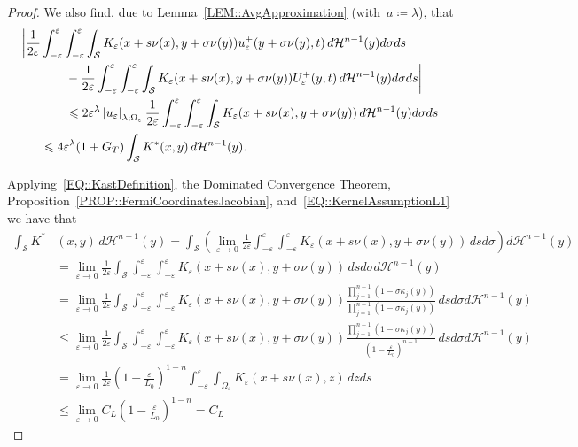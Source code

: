 \documentclass[12pt,a4paper]{amsart}
\makeatletter
\numberwithin{equation}{section}
\theoremstyle{definition}
\theoremstyle{remark}
\newcommand{\eps}{\varepsilon}
\newcommand{\abs}[1]{\left\lvert#1\right\rvert}
\renewcommand{\leq}{\leqslant}
\newcommand{\const}[1]{%
  \csname const@#1\endcsname%
}
\newcommand{\constapp}[1]{%
  \csname constapp@#1\endcsname%
}
\makeatother
\begin{document}
\begin{proof}
    We also find, due to Lemma~\ref{LEM::AvgApproximation} (with~$a\coloneq\lambda$), that
    \begin{equation}\label{EQ::KepsEstimateUu}
        \begin{split}
            \bigg|\frac{1}{2\eps}&\int_{-\eps}^\eps \int_{-\eps}^\eps\int_{\mathcal{S}} K_\eps(x+s\nu(x),y+\sigma\nu(y))u_\eps^+(y+\sigma\nu(y),t)\,d\mathcal{H}^{n-1}(y)d\sigma ds\\
                &\qquad - \frac{1}{2\eps}\int_{-\eps}^\eps \int_{-\eps}^\eps\int_{\mathcal{S}} K_\eps(x+s\nu(x),y+\sigma\nu(y))U_\eps^+(y,t)\,d\mathcal{H}^{n-1}(y)d\sigma ds\bigg|\\
                &\qquad \leq 2\eps^{\lambda}\abs{u_\eps}_{\lambda;\Omega_\eps}\frac{1}{2\eps}\int_{-\eps}^\eps \int_{-\eps}^\eps\int_{\mathcal{S}} K_\eps(x+s\nu(x),y+\sigma\nu(y))\,d\mathcal{H}^{n-1}(y)d\sigma ds\\
                &\leq 4\eps^\lambda \constapp{CONST::HolderEmbeddingA}\const{CONST::UniformRegularity}(1+G_T)\int_{\mathcal{S}}K^\ast(x,y)\,d\mathcal{H}^{n-1}(y).
        \end{split}
    \end{equation}

    Applying~\eqref{EQ::KastDefinition}, the Dominated Convergence Theorem, Proposition~\ref{PROP::FermiCoordinatesJacobian}, and~\eqref{EQ::KernelAssumptionL1} we have that
    \begin{equation}\label{EQ::KastIsL1}
        \begin{split}
            \int_{\mathcal{S}}K^\ast&(x,y)\,d\mathcal{H}^{n-1}(y) = \int_{\mathcal{S}}\left(\lim_{\eps \to 0}\frac{1}{2\eps}\int_{-\eps}^\eps \int_{-\eps}^\eps K_\eps(x+s\nu(x),y+\sigma\nu(y))\,dsd\sigma\right) d\mathcal{H}^{n-1}(y)\\
                & = \lim_{\eps \to 0} \frac{1}{2\eps} \int_{\mathcal{S}}\int_{-\eps}^\eps \int_{-\eps}^\eps K_\eps(x+s\nu(x),y+\sigma\nu(y))\,dsd\sigma d\mathcal{H}^{n-1}(y)\\
                & = \lim_{\eps \to 0} \frac{1}{2\eps} \int_{\mathcal{S}}\int_{-\eps}^\eps \int_{-\eps}^\eps K_\eps(x+s\nu(x),y+\sigma\nu(y)) \frac{\prod_{j=1}^{n-1}(1-\sigma \kappa_j(y))}{\prod_{j=1}^{n-1}(1-\sigma \kappa_j(y))}\,dsd\sigma d\mathcal{H}^{n-1}(y)\\
                & \leq \lim_{\eps \to 0} \frac{1}{2\eps} \int_{\mathcal{S}}\int_{-\eps}^\eps \int_{-\eps}^\eps K_\eps(x+s\nu(x),y+\sigma\nu(y)) \frac{\prod_{j=1}^{n-1}(1-\sigma \kappa_j(y))}{{(1-\frac{\eps}{L_0})}^{n-1}}\,dsd\sigma d\mathcal{H}^{n-1}(y)\\
                & = \lim_{\eps \to 0} \frac{1}{2\eps}{\left(1-\frac{\eps}{L_0}\right)}^{1-n}\int_{-\eps}^\eps \int_{\Omega_\eps} K_\eps(x+s\nu(x),z)  \, dz ds\\
                & \leq \lim_{\eps \to 0} C_L {\left(1-\frac{\eps}{L_0}\right)}^{1-n} = C_L
        \end{split}
    \end{equation}


\end{proof}
\end{document}
